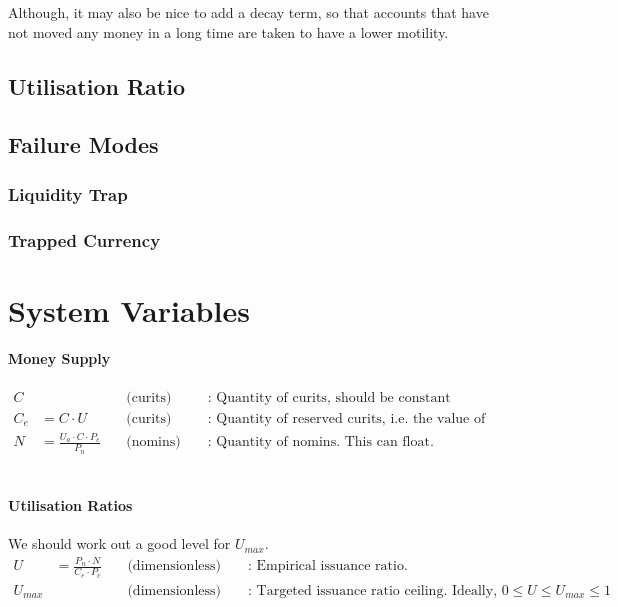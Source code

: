 \documentclass{article}
\begin{document}
Although, it may also be nice to add a decay term, so that accounts that have not moved any money in a long time
are taken to have a lower motility.


\pagebreak
\subsection{Utilisation Ratio}


\subsection{Failure Modes}
\subsubsection{Liquidity Trap}
\subsubsection{Trapped Currency}

\pagebreak
\section{System Variables}
\hfill

\paragraph{Money Supply}
\begin{align*}
    C & \ && \text{(curits)} && \text{ : Quantity of curits, should be constant} \\
    C_e &= C \cdot U \ && \text{(curits)} && \text{ : Quantity of reserved curits, i.e. the value of tokens have been issued against } \\
    N &= \frac{U_a \cdot C \cdot P_c}{P_n} \ && \text{(nomins)} && \text{ : Quantity of nomins. This can float.}
\end{align*}
\\

\paragraph{Utilisation Ratios} We should work out a good level for \(U_{max}\).
\begin{align*}
    U &= \frac{P_n \cdot N}{C_e \cdot P_c} \ && \text{(dimensionless)} && \text{ : Empirical issuance ratio. } \\
    U_{max} & \ && \text{(dimensionless)} && \text{ : Targeted issuance ratio ceiling. Ideally, } 0 \leq U \leq U_{max} \leq 1
\end{align*}
\\
\end{document}
